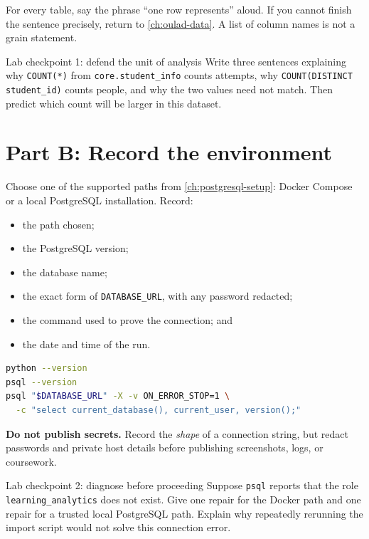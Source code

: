 \begin{validationbox}
For every table, say the phrase ``one row represents'' aloud. If you cannot
finish the sentence precisely, return to \cref{ch:oulad-data}. A list of column
names is not a grain statement.
\end{validationbox}

\begin{exercisebox}{Lab checkpoint 1: defend the unit of analysis}
\label{ex:lab-grain}
Write three sentences explaining why \texttt{COUNT(*)} from
\texttt{core.student\_info} counts attempts, why
\texttt{COUNT(DISTINCT student\_id)} counts people, and why the two values need
not match. Then predict which count will be larger in this dataset.
\end{exercisebox}

\section{Part B: Record the environment}

Choose one of the supported paths from \cref{ch:postgresql-setup}: Docker
Compose or a local PostgreSQL installation. Record:
\begin{itemize}
  \item the path chosen;
  \item the PostgreSQL version;
  \item the database name;
  \item the exact form of \texttt{DATABASE\_URL}, with any password redacted;
  \item the command used to prove the connection; and
  \item the date and time of the run.
\end{itemize}

\begin{lstlisting}[language=bash,caption={A concise environment record}]
python --version
psql --version
psql "$DATABASE_URL" -X -v ON_ERROR_STOP=1 \
  -c "select current_database(), current_user, version();"
\end{lstlisting}

\begin{commonmistakes}
\textbf{Do not publish secrets.}
Record the \emph{shape} of a connection string, but redact passwords and private
host details before publishing screenshots, logs, or coursework.
\end{commonmistakes}

\begin{exercisebox}{Lab checkpoint 2: diagnose before proceeding}
\label{ex:lab-environment}
Suppose \texttt{psql} reports that the role
\texttt{learning\_analytics} does not exist. Give one repair for the Docker path
and one repair for a trusted local PostgreSQL path. Explain why repeatedly
rerunning the import script would not solve this connection error.
\end{exercisebox}

